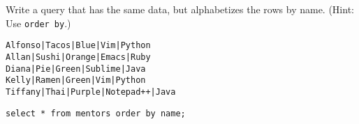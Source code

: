 \begin{blocksection}
\question Write a query that has the same data, but alphabetizes the rows by name. (Hint: Use \lstinline$order by$.)

\begin{lstlisting}
Alfonso|Tacos|Blue|Vim|Python
Allan|Sushi|Orange|Emacs|Ruby
Diana|Pie|Green|Sublime|Java
Kelly|Ramen|Green|Vim|Python
Tiffany|Thai|Purple|Notepad++|Java
\end{lstlisting}

\begin{solution}[1in]
\begin{lstlisting}
select * from mentors order by name;
\end{lstlisting}
\end{solution}
\end{blocksection}
